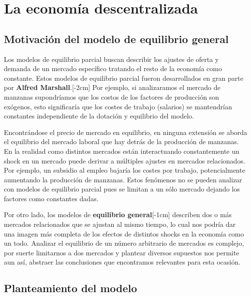 \section{La economía descentralizada}

\subsection{Motivación del modelo de equilibrio general}

Los modelos de equilibrio parcial buscan describir los ajustes de oferta y demanda de un mercado específico tratando el resto de la economía como constante. Estos modelos de equilibrio parcial fueron desarrollados en gran parte por \textbf{Alfred Marshall}.[-2cm] Por ejemplo, si analizaramos el mercado de manzanas supondríamos que los costos de los factores de producción son exógenos, esto significaría que los costes de trabajo (salarios) se mantendrían constantes independiente de la dotación y equilibrio del modelo. 

Encontrándose el precio de mercado en equilibrio, en ninguna extensión se aborda el equilibrio del mercado laboral que hay detrás de la producción de manzanas. En la realidad como distintos mercados están interactuando constantemente un shock en un mercado puede derivar a múltiples ajustes en mercados relacionados. Por ejemplo, un subsidio al empleo bajaría los costes por trabajo, potencialmente aumentando la producción de manzanas. Estos fenómenos no se pueden analizar con modelos de equilibrio parcial pues se limitan a un sólo mercado dejando los factores como constantes dadas. 

Por otro lado, los modelos de \textbf{equilibrio general}[-1cm] describen dos o más mercados relacionados que se ajustan al mismo tiempo, lo cual nos podría dar una imagen más completa de los efectos de distintos shocks en la economía como un todo. Analizar el equilibrio de un número arbitrario de mercados es complejo, por suerte limitarnos a dos mercados y plantear diversos supuestos nos permite aun así, abstraer las conclusiones que encontramos relevantes para esta ocasión. 

\subsection{Planteamiento del modelo}

